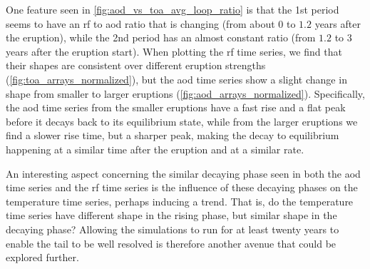 \documentclass{ametsocV5}
\begin{document}




One feature seen in \cref{fig:aod_vs_toa_avg_loop_ratio} is that the 1st period seems to
have an \ac{rf} to \ac{aod} ratio that is changing (from about \(0\) to \(1.2\) years
after the eruption), while the 2nd period has an almost constant ratio (from \(1.2\) to
\(3\) years after the eruption start). When plotting the \ac{rf} time series, we find
that their shapes are consistent over different eruption strengths
(\cref{fig:toa_arrays_normalized}), but the \ac{aod} time series show a slight change in
shape from smaller to larger eruptions (\cref{fig:aod_arrays_normalized}). Specifically,
the \ac{aod} time series from the smaller eruptions have a fast rise and a flat peak
before it decays back to its equilibrium state, while from the larger eruptions we find
a slower rise time, but a sharper peak, making the decay to equilibrium happening at a
similar time after the eruption and at a similar rate.

An interesting aspect concerning the similar decaying phase seen in both the \ac{aod}
time series and the \ac{rf} time series is the influence of these decaying phases on the
temperature time series, perhaps inducing a trend. That is, do the temperature time
series have different shape in the rising phase, but similar shape in the decaying
phase? Allowing the simulations to run for at least twenty years to enable the tail to
be well resolved is therefore another avenue that could be explored further.
\end{document}
